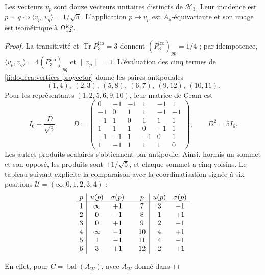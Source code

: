 \begin{proposition}
\label{ii:dodeca:realizacion}
Les vecteurs \(v_p\) sont douze vecteurs unitaires distincts de
\(\mathcal H_3\). Leur incidence est
\(p\sim q\Longleftrightarrow\langle v_p,v_q\rangle=1/\sqrt5\).
L’application \(p\mapsto v_p\) est \(A_5\)-équivariante et son image
est isométrique à \(\Omega_{12}^{\rm ico}\).
\end{proposition}
\begin{proof}
La transitivité et \(\operatorname{Tr}P_3^{\mathrm{ico}}=3\) donnent
\((P_3^{\mathrm{ico}})_{pp}=1/4\) ; par idempotence,
\(\langle v_p,v_q\rangle=4(P_3^{\mathrm{ico}})_{pq}\) et \(\|v_p\|=1\).
L’évaluation des cinq termes de
\eqref{ii:dodeca:vertices-proyector} donne les paires antipodales
\[
 (1,4),\ (2,3),\ (5,8),\ (6,7),\ (9,12),\ (10,11).
\]
Pour les représentants \((1,2,5,6,9,10)\), leur matrice de Gram est
\begin{equation}
 I_6+\frac D{\sqrt5},\qquad
 D=\begin{pmatrix}
 0&-1&-1&1&-1&1\\
 -1&0&1&1&-1&-1\\
 -1&1&0&1&1&1\\
 1&1&1&0&-1&1\\
 -1&-1&1&-1&0&1\\
 1&-1&1&1&1&0
 \end{pmatrix},\qquad D^2=5I_6.
 \label{ii:dodeca:gram}
\end{equation}
Les autres produits scalaires s’obtiennent par antipodie.
Ainsi, hormis un sommet et son opposé, les produits sont
\(\pm1/\sqrt5\), et chaque sommet a cinq voisins. Le tableau suivant
explicite la comparaison avec la coordinatisation signée à six positions
\(\mathcal U=(\infty,0,1,2,3,4)\) :
\begin{equation}
\begin{array}{c|cc@{\qquad}c|cc}
p&u(p)&\sigma(p)&p&u(p)&\sigma(p)\\ \hline
1&\infty&+1&7&3&-1\\
2&0&-1&8&1&+1\\
3&0&+1&9&2&-1\\
4&\infty&-1&10&4&+1\\
5&1&-1&11&4&-1\\
6&3&+1&12&2&+1
\end{array}
\label{ii:dodeca:carta-firmada}
\end{equation}
\begin{sloppypar}
En effet, pour \(C=\operatorname{bal}(A_W)\), avec \(A_W\) donné dans

\end{sloppypar}
\end{proof}
